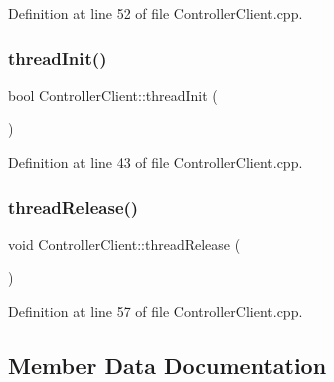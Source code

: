 Definition at line 52 of file Controller\+Client.\+cpp.

\hypertarget{classocra__recipes_1_1ControllerClient_aceef962c9a3cd42dc9defcaa356d6275}{}\label{classocra__recipes_1_1ControllerClient_aceef962c9a3cd42dc9defcaa356d6275} 
\subsubsection{\texorpdfstring{thread\+Init()}{threadInit()}}
{\footnotesize\ttfamily bool Controller\+Client\+::thread\+Init (\begin{DoxyParamCaption}{ }\end{DoxyParamCaption})\hspace{0.3cm}{\ttfamily [virtual]}}



Definition at line 43 of file Controller\+Client.\+cpp.

\hypertarget{classocra__recipes_1_1ControllerClient_ac42b7aad0b833f173475ed2a552ec159}{}\label{classocra__recipes_1_1ControllerClient_ac42b7aad0b833f173475ed2a552ec159} 
\subsubsection{\texorpdfstring{thread\+Release()}{threadRelease()}}
{\footnotesize\ttfamily void Controller\+Client\+::thread\+Release (\begin{DoxyParamCaption}{ }\end{DoxyParamCaption})\hspace{0.3cm}{\ttfamily [virtual]}}



Definition at line 57 of file Controller\+Client.\+cpp.



\subsection{Member Data Documentation}
\hypertarget{classocra__recipes_1_1ControllerClient_aced7fa4d435e58cc2832abdbad1e4cbd}{}\label{classocra__recipes_1_1ControllerClient_aced7fa4d435e58cc2832abdbad1e4cbd} 
